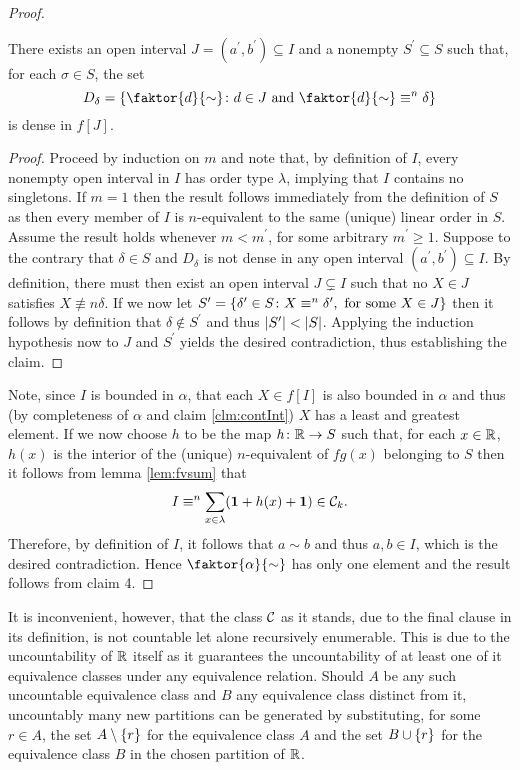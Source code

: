 \begin{proof}
	\begin{claim}
		There exists an open interval $J=(a^\prime,b^\prime)\subseteq I$ and a nonempty $S^\prime\subseteq S$ such that, for each $\sigma\in S$, the set
		\begin{equation}
			D_\delta=\setbuild{\faktor{d}{\sim}}{d\in J\text{ and }\faktor{d}{\sim}\nequiv{n}\delta}
		\end{equation}
		is dense in $f[J]$.
	\end{claim}
	\begin{proof}
		Proceed by induction on $m$ and note that, by definition of $I$, every nonempty open interval in $I$ has order type $\lambda$, implying that $I$ contains no singletons.  If $m=1$ then the result follows immediately from the definition of $S$ as then every member of $I$ is $n$-equivalent to the same (unique) linear order in $S$.  Assume the result holds whenever $m<m^\prime$, for some arbitrary $m^\prime\geq 1$.  Suppose to the contrary that $\delta\in S$ and $D_\delta$ is not dense in any open interval $(a^\prime,b^\prime)\subseteq I$.  By definition, there must then exist an open interval $J\subsetneq I$ such that no $X\in J$ satisfies $X\nequiv{n}\delta$.  If we now let $S^\prime=\left\lbrace \delta^\prime\in S\colon X\equiv^{n}\delta^\prime,\text{ for some }X\in J \right\rbrace$ then it follows by definition that $\delta\notin S^\prime$ and thus $\left\lvert S^\prime\right\rvert<\left\lvert S\right\rvert$.  Applying the induction hypothesis now to $J$ and $S^\prime$ yields the desired contradiction, thus establishing the claim.
	\end{proof}

	Note, since $I$ is bounded in $\alpha$, that each $X\in f[I]$ is also bounded in $\alpha$ and thus (by completeness of $\alpha$ and claim \ref{clm:contInt}) $X$ has a least and greatest element.  If we now choose $h$ to be the map $h\colon\mathbb{R}\to S$ such that, for each $x\in\mathbb{R}$, $h(x)$ is the interior of the (unique) $n$-equivalent of $fg(x)$ belonging to $S$ then it follows from lemma \ref{lem:fvsum} that
	\begin{equation}
		I\equiv^{n}\sum_{x\in\lambda}(\mathbf{1}+h(x)+\mathbf{1})\in\mathcal{C}_k.\label{eq:rsum}
	\end{equation}
	Therefore, by definition of $I$, it follows that $a\sim b$ and thus $a,b\in I$, which is the desired contradiction.  Hence $\faktor{\alpha}{\sim}$ has only one element and the result follows from claim 4.
\end{proof}

It is inconvenient, however, that the class $\mathcal{C}$ as it stands, due to the final clause in its definition, is not countable let alone recursively enumerable.  This is due to the uncountability of $\mathbb{R}$ itself as it guarantees the uncountability of at least one of it equivalence classes under any equivalence relation.  Should $A$ be any such uncountable equivalence class and $B$ any equivalence class distinct from it, uncountably many new partitions can be generated by substituting, for some $r\in A$, the set $A\setminus\left\lbrace r\right\rbrace$ for the equivalence class $A$ and the set $B\cup\left\lbrace r\right\rbrace$ for the equivalence class $B$ in the chosen partition of $\mathbb{R}$.

